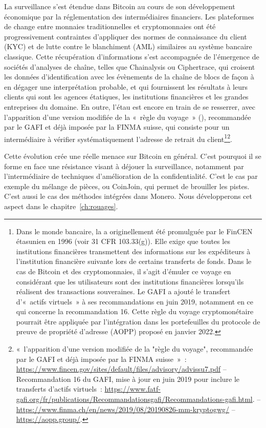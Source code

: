 La surveillance s'est étendue dans Bitcoin au cours de son développement économique par la réglementation des intermédiaires financiers. Les plateformes de change entre monnaies traditionnelles et cryptomonnaies ont été progressivement contraintes d'appliquer des normes de connaissance du client (KYC) et de lutte contre le blanchiment (AML) similaires au système bancaire classique. Cette récupération d'informations s'est accompagnée de l'émergence de sociétés d'analyses de chaîne, telles que Chainalysis ou Ciphertrace, qui croisent les données d'identification avec les évènements de la chaîne de blocs de façon à en dégager une interprétation probable, et qui fournissent les résultats à leurs clients qui sont les agences étatiques, les institutions financières et les grandes entreprises du domaine. En outre, l'étau est encore en train de se resserrer, avec l'apparition d'une version modifiée de la «~règle du voyage~» (), recommandée par le GAFI et déjà imposée par la FINMA suisse, qui consiste pour un intermédiaire à vérifier systématiquement l'adresse de retrait du client\footnote{Dans le monde bancaire, la  a originellement été promulguée par le FinCEN étasunien en 1996 (voir 31 CFR 103.33(g)). Elle exige que toutes les institutions financières transmettent des informations sur les expéditeurs à l'institution financière suivante lors de certains transferts de fonds. Dans le cas de Bitcoin et des cryptomonnaies, il s'agit d'émuler ce voyage en considérant que les utilisateurs sont des institutions financières lorsqu'ils réalisent des transactions souveraines. Le GAFI a ajouté le transfert d'«~actifs virtuels~» à ses recommandations en juin 2019, notamment en ce qui concerne la recommandation 16. Cette règle du voyage cryptomonétaire pourrait être appliquée par l'intégration dans les portefeuilles du protocole de preuve de propriété d'adresse (AOPP) proposé en janvier 2022.}\footnote{«~l'apparition d'une version modifiée de la "règle du voyage", recommandée par le GAFI et déjà imposée par la FINMA suisse~»~: \url{https://www.fincen.gov/sites/default/files/advisory/advissu7.pdf} -- Recommandation 16 du GAFI, mise à jour en juin 2019 pour inclure le transferts d'actifs virtuels~: \url{https://www.fatf-gafi.org/fr/publications/Recommandationsgafi/Recommandations-gafi.html}. -- \url{https://www.finma.ch/en/news/2019/08/20190826-mm-kryptogwg/} -- \url{https://aopp.group/}.}.

Cette évolution crée une réelle menace sur Bitcoin en général. C'est pourquoi il se forme en face une résistance visant à déjouer la surveillance, notamment par l'intermédiaire de techniques d'amélioration de la confidentialité. C'est le cas par exemple du mélange de pièces, ou CoinJoin, qui permet de brouiller les pistes. C'est aussi le cas des méthodes intégrées dans Monero. Nous développerons cet aspect dans le chapitre~\ref{ch:rouages}. %


